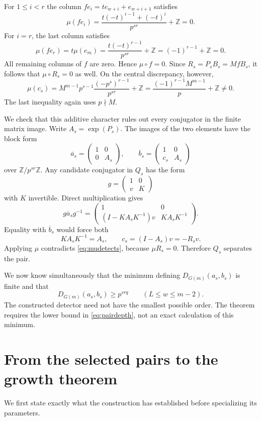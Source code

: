 \documentclass[11pt]{article}
\numberwithin{equation}{section}
\theoremstyle{definition}
\theoremstyle{remark}
\newcommand{\Z}{\mathbb Z}
\begin{document}
For $1\le i<r$ the column $fe_i=t e_{w+i}+e_{w+i+1}$ satisfies
\[
\mu(fe_i)=\frac{t(-t)^{i-1}+(-t)^i}{p^{sr}}+\Z=0.
\]
For $i=r$, the last column satisfies
\[
\mu(fe_r)=t\mu(e_m)
=\frac{t(-t)^{r-1}}{p^{sr}}+\Z
=(-1)^{r-1}+\Z=0.
\]
All remaining columns of $f$ are zero. Hence $\mu\circ f=0$. Since $R_s=P_sB_s=MfB_s$, it follows that $\mu\circ R_s=0$ as well. On the central discrepancy, however,
\begin{equation}\label{eq:mudetects}
\mu(c_s)=M^{m-1}p^{s-1}\frac{(-p^s)^{r-1}}{p^{sr}}+\Z
=\frac{(-1)^{r-1}M^{m-1}}p+\Z\ne0.
\end{equation}
The last inequality again uses $p\nmid M$.

We check that this additive character rules out every conjugator in the finite matrix image. Write $A_s=\exp(P_s)$. The images of the two elements have the block form
\[
\overline a_s=\begin{pmatrix}1&0\\0&A_s\end{pmatrix},\qquad
\overline b_s=\begin{pmatrix}1&0\\c_s&A_s\end{pmatrix}
\]
over $\Z/p^{sr}\Z$. Any candidate conjugator in $Q_s$ has the form
\[
g=\begin{pmatrix}1&0\\v&K\end{pmatrix}
\]
with $K$ invertible. Direct multiplication gives
\[
g\overline a_s g^{-1}
=\begin{pmatrix}1&0\\(I-KA_sK^{-1})v&KA_sK^{-1}\end{pmatrix}.
\]
Equality with $\overline b_s$ would force both
\[
KA_sK^{-1}=A_s,\qquad c_s=(I-A_s)v=-R_sv.
\]
Applying $\mu$ contradicts \eqref{eq:mudetects}, because $\mu R_s=0$. Therefore $Q_s$ separates the pair.

We now know simultaneously that the minimum defining $D_{G(m)}(a_s,b_s)$ is finite and that
\begin{equation}\label{eq:pairdepth}
D_{G(m)}(a_s,b_s)\ge p^{srq}
\qquad(L\le w\le m-2).
\end{equation}
The constructed detector need not have the smallest possible order. The theorem requires the lower bound in \eqref{eq:pairdepth}, not an exact calculation of this minimum.

\section{From the selected pairs to the growth theorem}\label{sec:completion}
We first state exactly what the construction has established before specializing its parameters.
\end{document}
